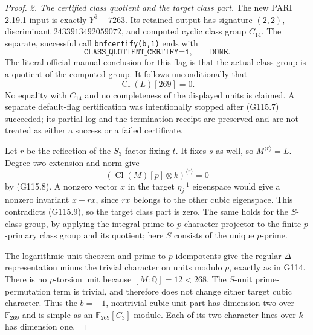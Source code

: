 \begin{proof}
\emph{2. The certified class quotient and the target class part.}
The new PARI 2.19.1 input is exactly $Y^6-7263$.
Its retained output has signature $(2,2)$, discriminant
$2433913492059072$, and computed cyclic class group $C_{14}$.
The separate, successful call \texttt{bnfcertify(b,1)} ends with
\[
             \texttt{CLASS\_QUOTIENT\_CERTIFY=1},
                       \qquad\texttt{DONE}.
 \tag{G115.7}
\]
The literal official manual conclusion for this flag is that
the actual class group is a quotient of the computed group.
It follows unconditionally that
\[
                         \operatorname{Cl}(L)[269]=0.
 \tag{G115.8}
\]
No equality with $C_{14}$ and no completeness of the displayed
units is claimed.  A separate default-flag certification was
intentionally stopped after (G115.7) succeeded; its partial log
and the termination receipt are preserved and are not treated
as either a success or a failed certificate.

Let $r$ be the reflection of the $S_3$ factor fixing $t$.
It fixes $s$ as well, so $M^{\langle r\rangle}=L$.
Degree-two extension and norm give
\[
       (\operatorname{Cl}(M)[p]\otimes k)^{\langle r\rangle}=0
 \tag{G115.9}
\]
by (G115.8).  A nonzero vector $x$ in the target
$\eta_j^{-1}$ eigenspace would give a nonzero invariant
$x+rx$, since $rx$ belongs to the other cubic eigenspace.
This contradicts (G115.9), so the target class part is zero.
The same holds for the $S$-class group, by applying the integral
prime-to-$p$ character projector to the finite $p$-primary class
group and its quotient; here $S$ consists of the unique $p$-prime.

The logarithmic unit theorem and prime-to-$p$ idempotents give
the regular $\Delta$ representation minus the trivial character
on units modulo $p$, exactly as in G114.
There is no $p$-torsion unit because $[M:\mathbb Q]=12<268$.
The $S$-unit prime-permutation term is trivial, and therefore
does not change either target cubic character.
Thus the $b=-1$, nontrivial-cubic unit part has dimension two
over $\mathbb F_{269}$ and is simple as an
$\mathbb F_{269}[C_3]$ module.  Each of its two character
lines over $k$ has dimension one.


\end{proof}
